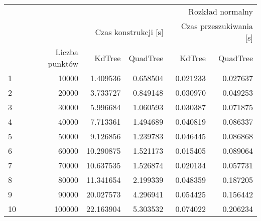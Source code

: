 \begin{tabular}{lrrrrr}
\toprule
 & \multicolumn{5}{r}{Rozkład normalny} \\
 &  & \multicolumn{2}{r}{Czas konstrukcji [s]} & \multicolumn{2}{r}{Czas przeszukiwania [s]} \\
 & Liczba punktów & KdTree & QuadTree & KdTree & QuadTree \\
\midrule
1 & 10000 & 1.409536 & 0.658504 & 0.021233 & 0.027637 \\
2 & 20000 & 3.733727 & 0.849148 & 0.030970 & 0.049253 \\
3 & 30000 & 5.996684 & 1.060593 & 0.030387 & 0.071875 \\
4 & 40000 & 7.713361 & 1.494689 & 0.040819 & 0.086337 \\
5 & 50000 & 9.126856 & 1.239783 & 0.046445 & 0.086868 \\
6 & 60000 & 10.290875 & 1.521173 & 0.015405 & 0.089064 \\
7 & 70000 & 10.637535 & 1.526874 & 0.020134 & 0.057731 \\
8 & 80000 & 11.341654 & 2.199339 & 0.048359 & 0.187205 \\
9 & 90000 & 20.027573 & 4.296941 & 0.054425 & 0.156442 \\
10 & 100000 & 22.163904 & 5.303532 & 0.074022 & 0.206234 \\
\bottomrule
\end{tabular}
